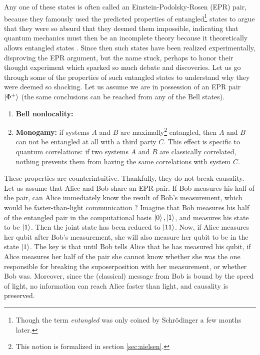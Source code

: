 Any one of these states is often called an Einstein-Podolsky-Rosen (EPR) pair, because they famously used the predicted properties of entangled\footnote{Though the term \textit{entangled} was only coined by Schrödinger a few months later.} states to argue that they were so absurd that they deemed them impossible, indicating that quantum mechanics must then be an incomplete theory because it theoretically allows entangled states \cite{einstein_can_1935}. Since then such states have been realized experimentally, disproving the EPR argument, but the name stuck, perhaps to honor their thought experiment which sparked so much debate and discoveries. Let us go through some of the properties of such entangled states to understand why they were deemed so shocking. Let us assume we are in possession of an EPR pair $\ket{\Phi^+}$ (the same conclusions can be reached from any of the Bell states).

\begin{enumerate} %
    \item \textbf{Bell nonlocality:} 
    \item \textbf{Monogamy:} if systems $A$ and $B$ are maximally\footnote{This notion is formalized in section \ref{sec:nielsen}.} entangled, then $A$ and $B$ can not be entangled at all with a third party $C$. This effect is specific to quantum correlations: if two systems $A$ and $B$ are classically correlated, nothing prevents them from having the same correlations with system $C$.
\end{enumerate}

These properties are counterintuitive. Thankfully, they do not break causality. Let us assume that Alice and Bob share an EPR pair. If Bob measures his half of the pair, can Alice immediately know the result of Bob's measurement, which would be faster-than-light communication ? Imagine that Bob measures his half of the entangled pair in the computational basis $\ket{0}, \ket{1}$, and measures his state to be $\ket{1}$. Then the joint state has been reduced to $\ket{11}$. Now, if Alice measures her qubit after Bob's measurement, she will also measure her qubit to be in the state $\ket{1}$. The key is that until Bob tells Alice that he has measured his qubit, if Alice measures her half of the pair she cannot know whether she was the one responsible for breaking the suposerposition with her measurement, or whether Bob was. Moreover, since the (classical) message from Bob is bound by the speed of light, no information can reach Alice faster than light, and causality is preserved.

